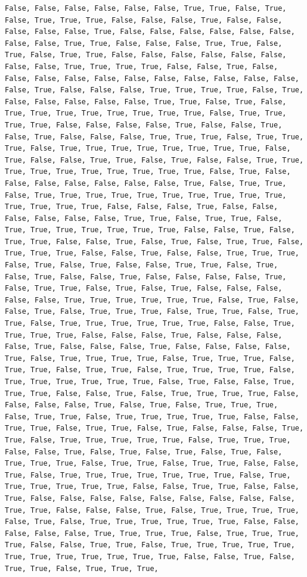 \documentclass[
  letterpaper,
  DIV=11,
  numbers=noendperiod]{scrartcl}
\begin{document}
\begin{verbatim}
False, False, False, False, False, False, True, True, False, True, False, True, True, True, False, False, False, True, False, False, False, False, False, True, False, False, False, False, False, False, False, False, True, True, False, False, False, True, True, False, True, False, True, True, False, False, False, False, False, False, False, False, True, True, True, True, False, False, True, False, False, False, False, False, False, False, False, False, False, False, False, True, False, False, False, True, True, True, True, False, True, False, False, False, False, False, True, True, False, True, False, True, True, True, True, True, True, True, True, False, True, True, True, True, False, False, False, False, True, False, False, True, False, True, False, False, False, True, True, True, False, True, True, True, False, True, True, True, True, True, True, True, True, False, True, False, False, True, True, False, True, False, False, True, True, True, True, True, True, True, True, True, True, False, True, False, False, False, False, False, False, False, True, False, True, True, False, True, True, True, True, True, True, True, True, True, True, True, True, True, True, False, False, False, True, False, False, False, False, False, False, True, True, False, True, True, False, True, True, True, True, True, True, True, False, False, True, False, True, True, False, False, True, False, True, False, True, True, False, True, True, True, False, False, True, False, False, True, True, True, False, True, False, True, False, False, True, True, False, True, False, True, False, False, True, False, False, False, False, True, False, True, True, False, True, False, True, False, False, False, False, False, True, True, True, True, True, True, False, True, False, False, True, False, True, True, True, False, True, True, False, True, True, False, True, True, True, True, True, True, False, False, True, True, True, True, False, False, False, True, False, False, False, False, True, False, False, False, True, False, False, False, False, True, False, True, True, True, True, False, True, True, True, False, True, True, False, True, True, False, True, True, True, True, False, True, True, True, True, True, True, False, True, False, False, True, True, True, False, False, True, False, True, True, True, True, False, False, False, False, True, False, True, False, True, True, True, False, True, True, False, True, True, True, True, True, False, False, True, True, False, True, True, False, True, False, False, False, True, True, False, True, True, True, True, True, False, True, True, True, False, False, True, False, True, False, True, False, True, False, True, True, True, False, True, True, False, True, True, False, False, True, False, True, True, True, True, True, True, True, False, True, True, True, True, True, True, False, False, True, True, False, False, True, False, False, False, False, False, False, False, False, False, True, True, False, False, False, True, False, True, True, True, True, False, True, False, True, True, True, True, True, True, False, False, False, False, False, True, True, True, True, False, True, True, True, True, False, False, True, True, False, True, True, True, True, True, True, True, True, True, True, True, True, False, False, True, False, True, True, False, True, True, True, 
\end{verbatim}
\end{document}

